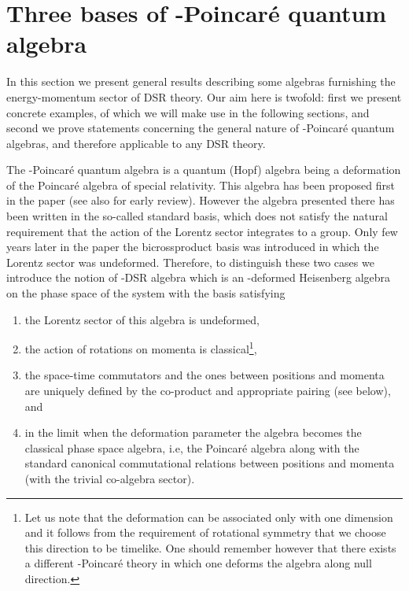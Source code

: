 \documentclass [prd,twocolumn,nofootinbib,showpacs]  {revtex4}
\begin{document}
\section{Three bases of \myHighlight{$\kappa$}\coordHE{}-Poincar\'e quantum algebra}

In this section we present general results describing some
algebras  furnishing the energy-momentum sector of DSR theory. Our
aim here is twofold: first we  present concrete examples, of which
we will make use in the following sections, and second we prove
statements concerning the general nature of \myHighlight{$\kappa$}\coordHE{}-Poincar\'e
quantum algebras, and therefore applicable to any DSR theory.

The \myHighlight{$\kappa$}\coordHE{}-Poincar\'e quantum algebra is a quantum (Hopf)
algebra being  a deformation of the Poincar\'e algebra of special
relativity. This algebra has been proposed first in the paper
\cite{lunoruto} (see also \cite{rurev} for early review). However
the algebra presented there has been written in the so-called
standard basis, which does not satisfy the natural requirement
that the action of the Lorentz sector integrates to a group. Only
few years later in the paper \cite{maru} the bicrossproduct basis
was introduced in which the Lorentz sector was undeformed.
Therefore, to distinguish these two cases we  introduce the notion
of \myHighlight{$\kappa$}\coordHE{}-DSR algebra  which is an \myHighlight{$\kappa$}\coordHE{}-deformed Heisenberg
algebra  on the phase space of the system with the basis
satisfying
\begin{enumerate}
\item the Lorentz sector of this algebra is undeformed,
\item the action of rotations  on momenta is classical\footnote{Let
us note that the deformation can be associated only with one
dimension and it follows from the requirement of rotational
symmetry that we choose this direction to be timelike. One should
remember however that there exists a different \myHighlight{$\kappa$}\coordHE{}-Poincar\'e
theory in which one deforms the algebra along null direction.},
\item the space-time commutators and the ones between positions and
momenta are uniquely defined by the co-product and appropriate
pairing (see below), and \item in the limit when the deformation
parameter \myHighlight{$\kappa \rightarrow\infty$}\coordHE{} the algebra becomes the
classical phase space algebra, i.e, the Poincar\'e algebra along
with the standard canonical commutational relations between
positions and momenta (with the trivial co-algebra sector).
\end{enumerate}
\end{document}
